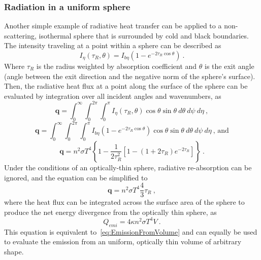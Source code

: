 \subsubsection{Radiation in a uniform sphere}
Another simple example of radiative heat transfer can be applied to a non-scattering, isothermal sphere that is surrounded by cold and black boundaries. 
The intensity traveling at a point within a sphere can be described as
\begin{equation}
    I_\eta{}(\tau{}_R,\theta{}) = I_{b\eta{}}\left(1-e^{-2\tau{}_R\cos{\theta}}\right) \ .
    \label{eq:emitting_sphere}
\end{equation}
Where $\tau{}_R$ is the radius weighted by absorption coefficient and $\theta{}$ is the exit angle (angle between the exit direction and the negative norm of the sphere's surface).
Then, the radiative heat flux at a point along the surface of the sphere can be evaluated by integration over all incident angles and wavenumbers, as
\begin{equation}
    \textbf{q}=\int_0^\infty{}\int_0^{2\pi}\int_0^{\pi{}}I_\eta{}(\tau{}_R,\theta)\cos{\theta}\sin{\theta}~d\theta{}~d\psi{}~d\eta{}~,
    \label{eq:heatflux}
\end{equation}
\begin{equation}
    \textbf{q}=\int_0^\infty{}\int_0^{2\pi}\int_0^{\pi{}}I_{b\eta{}}\left(1-e^{-2\tau{}_R\cos{\theta}}\right)\cos{\theta}\sin{\theta}~d\theta{}~d\psi{}~d\eta{}~\text{, and}
    \label{eq:heatflux}
\end{equation}
\begin{equation}
    \textbf{q}=n^2\sigma{}T^4\left\{1-\frac{1}{2\tau{}_R^2}\left[1-(1+2\tau{}_R)e^{-2\tau{}_R}\right]\right\}~.
    \label{eq:heatflux}
\end{equation}
Under the conditions of an optically-thin sphere, radiative re-absorption can be ignored, and the equation can be simplified to
\begin{equation}
    \textbf{q}=n^2\sigma{}T^4\frac{4}{3}\tau{}_R~,
    \label{eq:heatflux}
\end{equation}
where the heat flux can be integrated across the surface area of the sphere to produce the net energy divergence from the optically thin sphere, as
\begin{equation}
    Q_{emi}=4\kappa{}n^2\sigma{}T^4V~.
    \label{eq:RadEmis}
\end{equation}
This equation is equivalent to~\ref{eq:EmissionFromVolume} and can equally be used to evaluate the emission from an uniform, optically thin volume of arbitrary shape.

